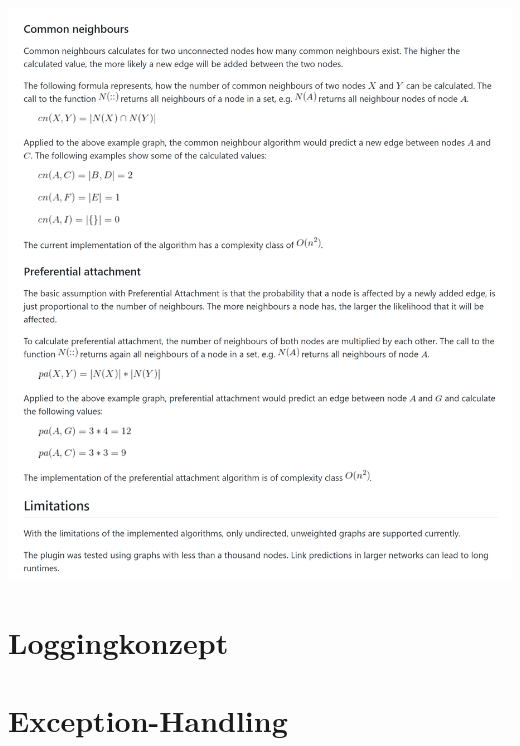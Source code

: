 \includegraphics[width=\textwidth]{resources/readme_pt3.png}

\newpage

\section{Loggingkonzept}
\label{loggingkonzept}

\section{Exception-Handling}
\label{exceptionhandling}


